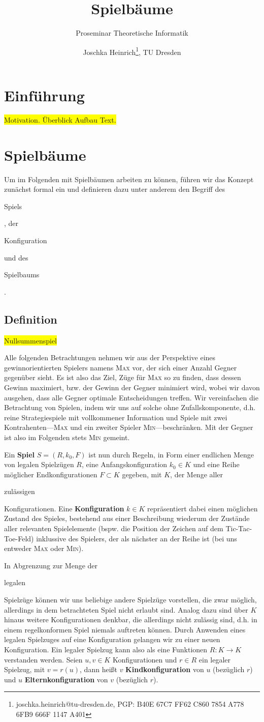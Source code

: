 \documentclass[a4paper,twoside]{scrartcl}
\title{Spielbäume}
\subtitle{Proseminar Theoretische Informatik}
\author{Joschka Heinrich\thanks{joschka.heinrich@tu-dresden.de, PGP: \textsc{B40E 67C7 FF62 C860 7854 A778 6FB9 666F 1147 A401}}, TU Dresden}
\newcommand\e[1]{\begin{em}#1\end{em}}
\newcommand\q[1]{\glqq #1\grqq}
\newcommand\todo[1]{\colorbox{yellow}{#1}}
\begin{document}
\maketitle

\section{Einführung}
\todo{Motivation. Überblick Aufbau Text.}

\section{Spielbäume}
Um im Folgenden mit Spielbäumen arbeiten zu können, führen wir das Konzept zunächst formal ein und definieren dazu unter anderem den Begriff des \e{Spiels}, der \e{Konfiguration} und des \e{Spielbaums}.

\subsection{Definition}

\todo{Nullsummenspiel}

Alle folgenden Betrachtungen nehmen wir aus der Perspektive eines gewinnorientierten Spielers namens \textsc{Max} vor, der sich einer Anzahl Gegner gegenüber sieht. Es ist also das Ziel, Züge für \textsc{Max} so zu finden, dass dessen Gewinn maximiert, bzw. der Gewinn der Gegner minimiert wird, wobei wir davon ausgehen, dass alle Gegner optimale Entscheidungen treffen. Wir vereinfachen die Betrachtung von Spielen, indem wir uns auf solche ohne Zufallskomponente, d.h. reine Strategiespiele mit vollkommener Information und Spiele mit zwei Kontrahenten---\textsc{Max} und ein zweiter Spieler \textsc{Min}---beschränken. Mit \q{der Gegner} ist also im Folgenden stets \textsc{Min} gemeint. 

Ein \textbf{Spiel} $S = (R,k_0,F)$ ist nun durch Regeln, in Form einer endlichen Menge von legalen Spielzügen $R$, eine Anfangskonfiguration $k_0 \in K$ und eine Reihe möglicher Endkonfigurationen $F \subset K$ gegeben, mit $K$, der Menge aller \e{zulässigen} Konfigurationen. Eine \textbf{Konfiguration} $k \in K$ repräsentiert dabei einen möglichen Zustand des Spieles, bestehend aus einer Beschreibung wiederum der Zustände aller relevanten Spielelemente (bspw. die Position der Zeichen auf dem Tic-Tac-Toe-Feld) inklussive des Spielers, der als nächster an der Reihe ist (bei uns entweder \textsc{Max} oder \textsc{Min}).

In Abgrenzung zur Menge der \e{legalen} Spielzüge können wir uns beliebige andere Spielzüge vorstellen, die zwar möglich, allerdings in dem betrachteten Spiel nicht erlaubt sind. Analog dazu sind über $K$ hinaus weitere Konfigurationen denkbar, die allerdings nicht zulässig sind, d.h. in einem regelkonformen Spiel niemals auftreten können. Durch Anwenden eines legalen Spielzuges auf eine Konfiguration gelangen wir zu einer neuen Konfiguration. Ein legaler Spielzug kann also als eine Funktionen $R:K \to K$ verstanden werden. Seien $u,v \in K$ Konfigurationen und $r \in R$ ein legaler Spielzug, mit $v = r(u)$, dann heißt $v$ \textbf{Kindkonfiguration} von $u$ (bezüglich $r$) und $u$ \textbf{Elternkonfiguration} von $v$ (bezüglich $r$). 
\end{document}
